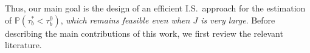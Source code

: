 \documentclass[aap,preprint]{imsart}
\newcommand{\Pro}{{\mathbb{P}}}
\theoremstyle{plain}
\theoremstyle{definition}
\begin{document}
Thus, our main goal is the design of an efficient I.S.~approach for the estimation of $\Pro\left(\tau_{b}^{*} < \tau_b^{0}\right)$, \textit{which remains feasible even when $J$ is very large}. Before describing the main contributions of this work, we first review the relevant literature.




 


 
 

\end{document}
